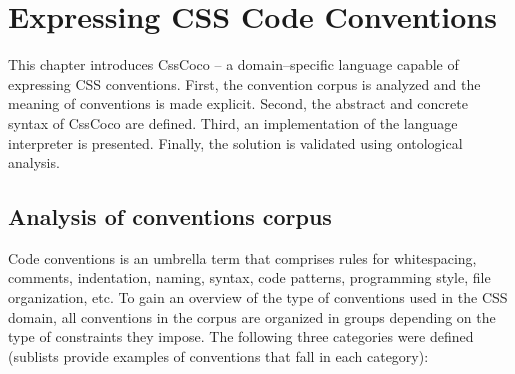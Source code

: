 \chapter{Expressing CSS Code Conventions}
\label{sec:expressing}

This chapter introduces CssCoco -- a domain--specific language capable of expressing CSS conventions. First, the convention corpus is analyzed and the meaning of conventions is made explicit. Second, the abstract and concrete syntax of CssCoco are defined. Third, an implementation of the language interpreter is presented. Finally, the solution is validated using ontological analysis.

\section{Analysis of conventions corpus}

Code conventions is an umbrella term that comprises rules for whitespacing, comments, indentation,
naming, syntax, code patterns, programming style, file organization, etc. To gain an overview of the
type of conventions used in the CSS domain, all conventions in the corpus are organized in groups
depending on the type of constraints they impose. The following three categories were defined
(sublists provide examples of conventions that fall in each category):

